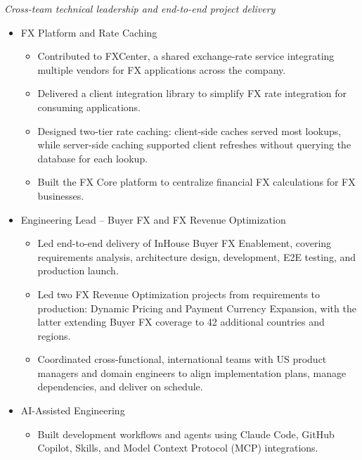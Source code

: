 \documentclass{resume}
\begin{document}
\textit{Cross-team technical leadership and end-to-end project delivery}
\begin{itemize}
  \item FX Platform and Rate Caching
  \begin{itemize}
    \item[。] Contributed to FXCenter, a shared exchange-rate service integrating multiple vendors for FX applications across the company.
    \item[。] Delivered a client integration library to simplify FX rate integration for consuming applications.
    \item[。] Designed two-tier rate caching: client-side caches served most lookups, while server-side caching supported client refreshes without querying the database for each lookup.
    \item[。] Built the FX Core platform to centralize financial FX calculations for FX businesses.
  \end{itemize}
  \item Engineering Lead -- Buyer FX and FX Revenue Optimization
  \begin{itemize}
    \item[。] Led end-to-end delivery of InHouse Buyer FX Enablement, covering requirements analysis, architecture design, development, E2E testing, and production launch.
    \item[。] Led two FX Revenue Optimization projects from requirements to production: Dynamic Pricing and Payment Currency Expansion, with the latter extending Buyer FX coverage to 42 additional countries and regions.
    \item[。] Coordinated cross-functional, international teams with US product managers and domain engineers to align implementation plans, manage dependencies, and deliver on schedule.
  \end{itemize}
  \item AI-Assisted Engineering
  \begin{itemize}
    \item[。] Built development workflows and agents using Claude Code, GitHub Copilot, Skills, and Model Context Protocol (MCP) integrations.
  \end{itemize}
\end{itemize}
\end{document}
